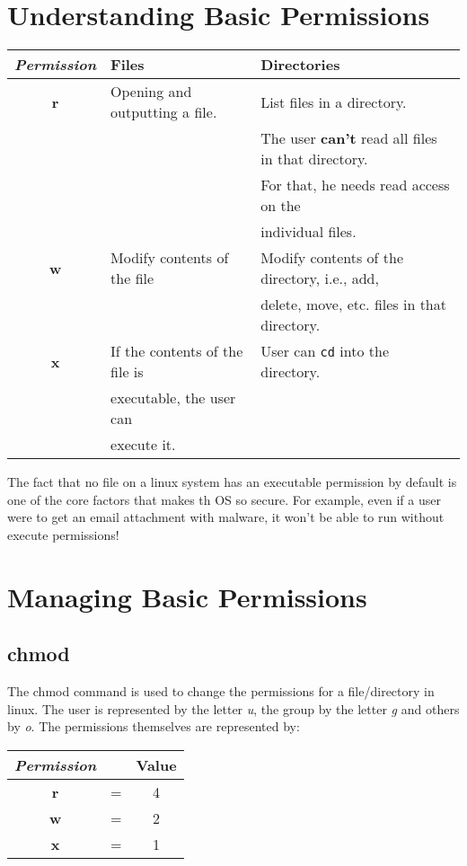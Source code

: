 \section{Understanding Basic Permissions}
\noindent
\begin{tabular}{cll}
	\toprule
	\textit{Permission} &\textbf{Files} &\textbf{Directories} \\
	\midrule
	\textbf{r} &Opening and outputting a file. &List files in a directory.\\
	&&The user \textbf{can't} read all files in that directory. \\ 
	&&For that, he needs read access on the \\ 
	&&individual files. \\
	\midrule
	\textbf{w}	&Modify contents of the file &Modify contents of the directory, i.e., add, \\
	&&delete, move, etc. files in that directory. \\
	\midrule
	\textbf{x} &If the contents of the file is  &User can \verb|cd| into the directory. \\
	&executable, the user can & \\
	& execute it. & \\
	\bottomrule
\end{tabular}

\noindent
The fact that no file on a linux system has an executable permission by default is one of the core factors that makes th OS so secure. For example, even if a user were to get an email attachment with malware, it won't be able to run without execute permissions!

	\section{Managing Basic Permissions}
\subsection{chmod}
The chmod command is used to change the permissions for a file/directory in linux. The user is represented by the letter \textit{u}, the group by the letter \textit{g} and others by \textit{o}. The permissions themselves are represented by:

\vspace{-10pt}
\begin{center}
	\begin{tabular}{ccc}
		\toprule
		\textit{Permission} & &\textbf{Value} \\
		\midrule
		\textbf{r} &= &4 \\
		\textbf{w} &= &2 \\
		\textbf{x} &= &1 \\
		\bottomrule
	\end{tabular}
\end{center}
\vspace{-10pt}

